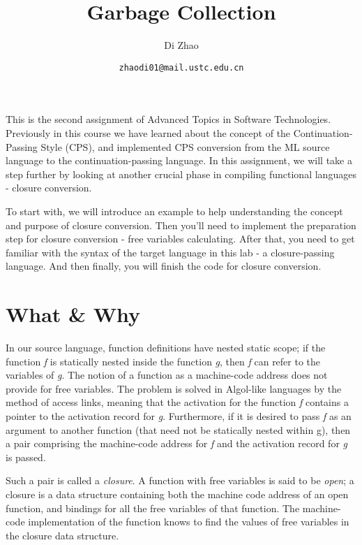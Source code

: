 \documentclass{article}
\theoremstyle{definition}
\theoremstyle{remark}
\numberwithin{equation}{section}
\begin{document}
\newcommand{\env}[1]{[\![#1]\!]\kappa}
\newcommand{\round}[1]{(\!|#1|\!)}

\title{Garbage Collection}%
\author{Di Zhao}%
\date{\small{\texttt{zhaodi01@mail.ustc.edu.cn}}}%

\maketitle

This is the second assignment of Advanced Topics in Software
Technologies. Previously in this course we have learned about the concept
 of the Continuation-Passing Style (CPS), and implemented CPS conversion
 from the ML source language to the continuation-passing language. In this
 assignment, we will take a step further by looking at another crucial
 phase in compiling functional languages - closure conversion.

To start with, we will introduce an example to help understanding the concept
 and purpose of closure conversion. Then you'll need to implement the preparation
 step for closure conversion - free variables calculating. After that, you need
 to get familiar with the syntax of the target language in this lab - a
 closure-passing language. And then finally, you will finish the code for
 closure conversion.

\section{What \& Why}

In our source language, function definitions have nested
static scope; if the function \emph{f} is statically nested inside the
function \emph{g}, then \emph{f} can refer to the variables of \emph{g}.
The notion of a function as a machine-code address does
not provide for free variables. The problem is solved in
 Algol-like languages by the method of access links,
meaning that the activation for the function \emph{f} contains a
pointer to the activation record for \emph{g}. Furthermore, if it
 is desired to pass \emph{f} as an argument to another function (that need not
  be statically nested within g), then a pair comprising the machine-code
address for \emph{f} and the activation record for \emph{g} is passed.

Such a pair is called a \emph{closure}. A function with
free variables is said to be \emph{open}; a closure is a data structure
containing both the machine code address of an open function, and bindings for
all the free variables of that function. The machine-code implementation of the
function knows to find the values of free variables in the closure data structure.
\end{document}
